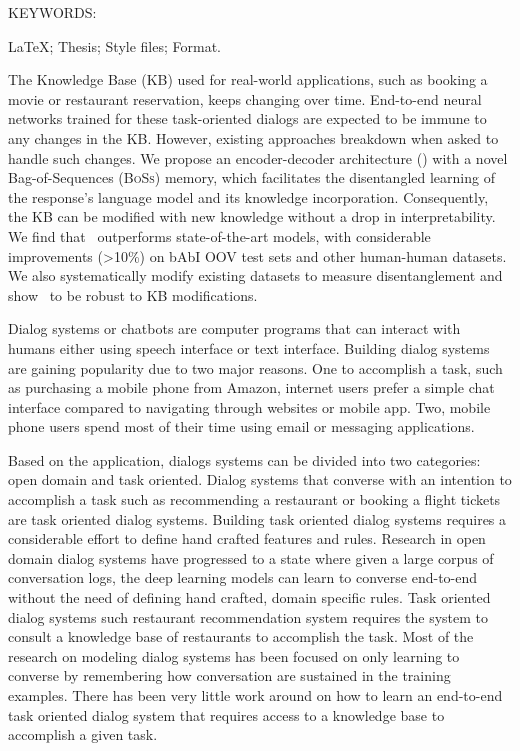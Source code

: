 \noindent KEYWORDS: \hspace*{0.5em} \parbox[t]{4.4in}{\LaTeX ; Thesis;
  Style files; Format.}

\vspace*{24pt}

\noindent The Knowledge Base (KB) used for real-world applications, such as booking a movie or restaurant reservation, keeps changing over time. End-to-end neural networks trained for these task-oriented dialogs are expected to be immune to any changes in the KB. However, existing approaches breakdown when asked to handle such changes. We propose an encoder-decoder architecture (\sys) with a novel Bag-of-Sequences (\textsc{BoSs}) memory, which facilitates the disentangled learning of the response's language model and its knowledge incorporation. Consequently, the KB can be modified with new knowledge without a drop in interpretability. We find that \sys\ outperforms state-of-the-art models, with considerable improvements (\textgreater10\%) on bAbI OOV test sets and other human-human datasets. We also systematically modify existing datasets to measure disentanglement and show \sys\ to be robust to KB modifications.


Dialog systems or chatbots are computer programs that can interact with humans either using speech interface or text interface. Building dialog systems are gaining popularity due to two major reasons. One to accomplish a task, such as purchasing a mobile phone from Amazon, internet users prefer a simple chat interface compared to navigating through websites or mobile app. Two, mobile phone users spend most of their time using email or messaging applications.

Based on the application, dialogs systems can be divided into two categories: open domain and task oriented. Dialog systems that converse with an intention to accomplish a task such as  recommending a restaurant or booking a flight tickets are task oriented dialog systems. Building task oriented dialog systems requires a considerable effort to define hand crafted features and rules. Research in open domain dialog systems have progressed to a state where given a large corpus of conversation logs, the deep learning models can learn to converse end-to-end without the need of defining hand crafted, domain specific rules. Task oriented dialog systems such  restaurant recommendation system requires the system to consult a knowledge base of restaurants to accomplish the task. Most of the research on modeling dialog systems has been focused on only learning to converse by remembering how conversation are sustained in the training examples. There has been very little work around on how to learn an end-to-end task oriented dialog system that requires access to a knowledge base to accomplish a given task. 

